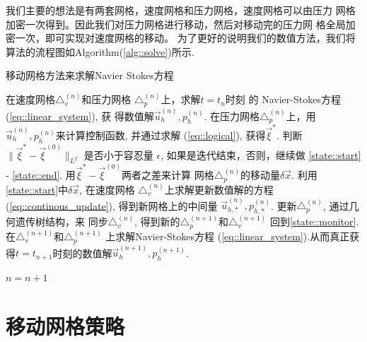 \documentclass{report}
\theoremstyle{Remark}
\begin{document}
   我们主要的想法是有两套网格，速度网格和压力网格，速度网格可以由压力
   网格加密一次得到。因此我们对压力网格进行移动，然后对移动完的压力网
   格全局加密一次，即可实现对速度网格的移动。
   为了更好的说明我们的数值方法，我们将算法的流程图如Algorithm(\ref{alg::solve})所示.
   \begin{algorithm}
     \caption{移动网格方法来求解Navier Stokes方程}
     \begin{algorithmic}[1]
             \State 在速度网格$\triangle_v^{(n)}$和压力网格
                    $\triangle_p^{(n)}$上，求解$t = t_n$时刻
                    的 Navier-Stokes方程(\ref{eq::linear_system}), 获
                    得数值解$\vec{u}_h^{(n)}, p_h^{(n)}$. 
             \State 在压力网格$\triangle_p^{(n)}$上，用$\vec{u}_h^{(n)},
                    p_h^{(n)}$来计算控制函数, 并通过求解
                    (\ref{eq::logical}), 获得$\vec{\xi}^*$. \label{state::monitor}
             \State 判断$\parallel \vec{\xi}^* -
                    \vec{\xi}^{(0)} \parallel_{L^2}$ 是否小于容忍量
                    $\epsilon$, 如果是迭代结束，否则，继续做
                    \ref{state::start} - \ref{state::end}.
             \State 用$\vec{\xi}^* - \vec{\xi}^{(0)}$两者之差来计算
                    网格$\triangle_p^{(n)}$的移动量$\delta \vec{x}$.
                    \label{state::start}
             \State 利用\ref{state::start}中$\delta \vec{x}$, 在速度网格
                    $\triangle_v^{(n)}$上求解更新数值解的方程
                    (\ref{eq::continous_update}), 得到新网格上的中间量
                    $\vec{u}_{h, *}^{(n)}, p_{h, *}^{(n)}$.
             \State 更新$\triangle_p^{(n)}$, 通过几何遗传树结构，来
                    同步$\triangle_v^{(n)}$, 得到新的$\triangle_p^{(n
                    + 1)}$和$\triangle_v^{(n + 1)}$
             \State 回到\ref{state::monitor}. \label{state::end}
             \State 在$\triangle_v^{(n + 1)}$和$\triangle_p^{(n + 1)}$
                    上求解Navier-Stokes方程
                    (\ref{eq::linear_system}).从而真正获得$t = t_{n +
                      1}$时刻的数值解$\vec{u}_h^{(n + 1)}, p_h^{(n +
                      1)}$.
             
             \State $n = n + 1$
        \EndWhile     
     \end{algorithmic}
     \label{alg::solve}
   \end{algorithm}
\chapter{移动网格策略}
\end{document}
